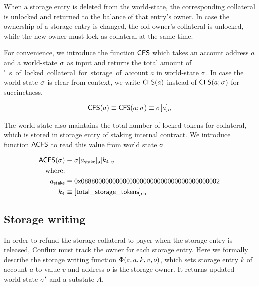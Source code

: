 When a storage entry is deleted from the world-state, the corresponding \sunitprice collateral is unlocked and returned to the balance of that entry's owner.
In case the ownership of a storage entry is changed, 
the old owner's \sunitprice collateral is unlocked,
while the new owner must lock \sunitprice as collateral at the same time.

For convenience, we introduce the function $\mathsf{CFS}$ which takes an account address $a$ and a world-state $\mathbf{\sigma}$ as input and returns the total amount of \unit's of locked collateral for storage of account $a$ in world-state $\mathbf{\sigma}$.
In case the world-state $\mathbf{\sigma}$ is clear from context, we write $\mathsf{CFS}(a)$ instead of $\mathsf{CFS}(a;\mathbf{\sigma})$ for succinctness.

\begin{align}
	\mathsf{CFS}(a) \equiv \mathsf{CFS}(a;\mathbf{\sigma}) \equiv \mathbf{\sigma}[a]_o
\end{align}

The world state also maintains the total number of locked tokens for collateral, which is stored in storage entry of staking internal contract. We introduce function ${\sf ACFS}$ to read this value from world state $\mathbf{\sigma}$

\begin{align}
	\mathsf{ACFS}(\st) &\eqdef \st[a_{\sf stake}]_{\bf s}[k_4]_v\\
	\mbox{where:} & \\
	a_{\sf stake} &\eqdef \stakingcontract \\ 
	k_4 &\eqdef {\sf [total\char`_storage\char`_tokens]_{\sf ch}} 
\end{align}

\subsection{Storage writing}\label{sec:storage_maintain}

In order to refund the storage collateral to payer when the storage entry is released, Conflux must track the owner for each storage entry. Here we formally describe the storage writing function $\Phi(\mathbf{\sigma},a,k,v,o)$, which sets storage entry $k$ of account $a$ to value $v$ and address $o$ is the storage owner. It returns updated world-state $\mathbf{\sigma}'$ and a substate $A$.


